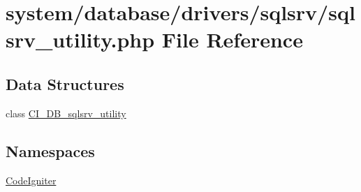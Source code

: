 \hypertarget{sqlsrv__utility_8php}{\section{system/database/drivers/sqlsrv/sqlsrv\-\_\-utility.php File Reference}
\label{sqlsrv__utility_8php}
}
\subsection*{Data Structures}
\begin{DoxyCompactItemize}
\item 
class \hyperlink{class_c_i___d_b__sqlsrv__utility}{C\-I\-\_\-\-D\-B\-\_\-sqlsrv\-\_\-utility}
\end{DoxyCompactItemize}
\subsection*{Namespaces}
\begin{DoxyCompactItemize}
\item 
\hyperlink{namespace_code_igniter}{Code\-Igniter}
\end{DoxyCompactItemize}
